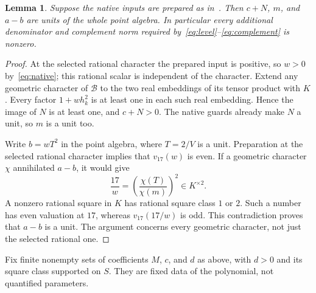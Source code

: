 \documentclass[11pt,a4paper]{article}
\newtheorem{lemma}[theorem]{Lemma}
\begin{document}
\begin{lemma}\label{lem:guards}
Suppose the native inputs are prepared as in~\cite{Complements}.
Then $c+N$, $m$, and $a-b$ are units of the whole point algebra.
In particular every additional denominator and complement norm
required by~\eqref{eq:level}--\eqref{eq:complement} is nonzero.
\end{lemma}
\begin{proof}
At the selected rational character the prepared input is positive,
so $w>0$ by~\eqref{eq:native}; this rational scalar is independent
of the character. Extend any geometric character of $\mathcal B$
to the two real embeddings of its tensor product with $K$.
Every factor $1+wh_k^2$ is at least one in each such real embedding.
Hence the image of $N$ is at least one, and $c+N>0$.
The native guards already make $N$ a unit, so $m$ is a unit too.

Write $b=wT^2$ in the point algebra, where $T=2/V$ is a unit.
Preparation at the selected rational character implies that
$v_{17}(w)$ is even. If a geometric character $\chi$ annihilated
$a-b$, it would give
\[
                       \frac{17}{w}
                         =\left(\frac{\chi(T)}{\chi(m)}\right)^2
                         \in K^{\times2}.
\]
A nonzero rational square in $K$ has rational square class $1$
or $2$. Such a number has even valuation at $17$, whereas
$v_{17}(17/w)$ is odd. This contradiction proves that $a-b$
is a unit. The argument concerns every geometric character,
not just the selected rational one.
\end{proof}

Fix finite nonempty sets of coefficients $M$, $c$, and $d$ as above,
with $d>0$ and its square class supported on $S$.
They are fixed data of the polynomial, not quantified parameters.
\end{document}
